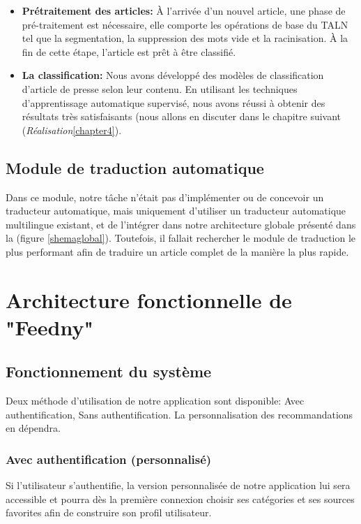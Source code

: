 \begin{itemize}
	\item \textbf{Prétraitement des articles:}
	À l'arrivée d'un nouvel article, une phase de pré-traitement est nécessaire, elle comporte les opérations de base du TALN tel que la segmentation, la suppression des mots vide et la racinisation.
    À la fin de cette étape, l'article est prêt à être classifié.\\
    \item \textbf{La classification:}
    Nous avons développé des modèles de classification d'article de presse selon leur contenu. En utilisant les techniques d'apprentissage automatique supervisé, nous avons réussi à obtenir des résultats très satisfaisants (nous allons en discuter dans le chapitre suivant (\emph{Réalisation}\ref{chapter4}).
\end{itemize}

\subsection{Module de traduction automatique}
Dans ce module, notre tâche n'était pas d'implémenter ou de concevoir un traducteur automatique, mais uniquement d'utiliser un traducteur automatique multilingue existant, et de l'intégrer dans notre architecture globale présenté dans la (figure \ref{shemaglobal}). 
Toutefois, il fallait rechercher le module de traduction le plus performant afin de traduire un article complet de la manière la plus rapide.

\section{Architecture fonctionnelle de "Feedny"}

\subsection{Fonctionnement du système}
Deux méthode d'utilisation de notre application sont disponible: Avec authentification, Sans authentification. La personnalisation des recommandations en dépendra.

\subsubsection{Avec authentification (personnalisé)}
Si l'utilisateur s'authentifie, la version personnalisée de notre application lui sera accessible et pourra dès la première connexion choisir ses catégories et ses sources favorites afin de construire son profil utilisateur.


